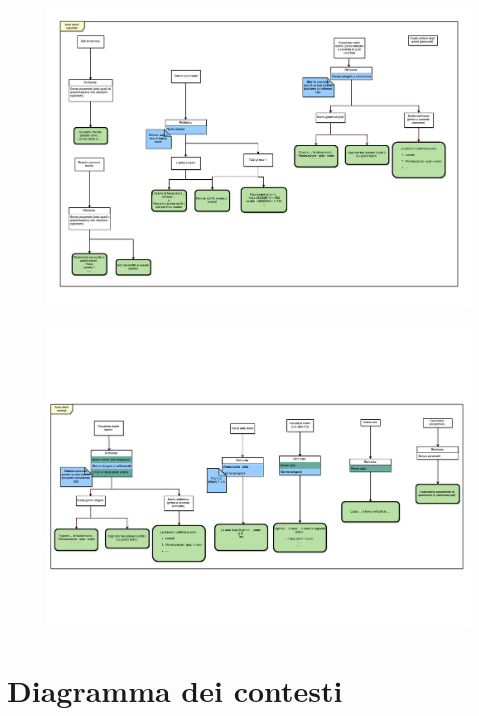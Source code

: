 \documentclass[]{article}
\begin{document}
\begin{figure}[htpb]
\vspace*{-3cm} 
\hspace*{-1cm}
\includegraphics[width=2\textwidth, angle =90 ]{p02}

\end{figure}


\begin{figure}[hbtp]
\vspace*{-3cm} 
\hspace*{-1cm}
\includegraphics[width=2\textwidth, angle =90 ]{p03}
\end{figure}

\pagebreak

\section{Diagramma dei contesti}
\end{document}

